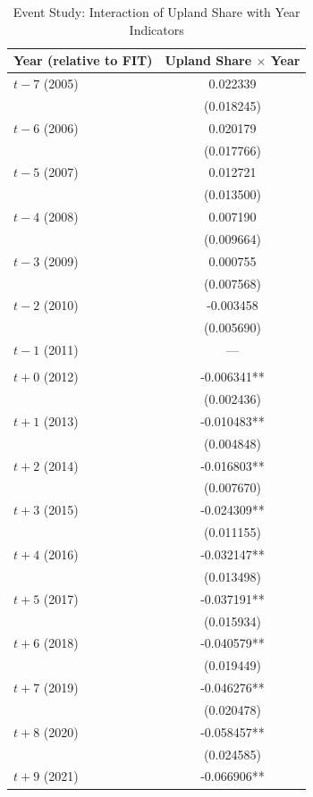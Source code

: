 \begin{table}[H]
\centering
\caption{Event Study: Interaction of Upland Share with Year Indicators}
\begin{threeparttable}
\begin{tabular}{lc}
\toprule
Year (relative to FIT) & Upland Share $\times$ Year \\
\midrule
$t-7$ (2005) & 0.022339 \\
 & (0.018245) \\
\addlinespace
$t-6$ (2006) & 0.020179 \\
 & (0.017766) \\
\addlinespace
$t-5$ (2007) & 0.012721 \\
 & (0.013500) \\
\addlinespace
$t-4$ (2008) & 0.007190 \\
 & (0.009664) \\
\addlinespace
$t-3$ (2009) & 0.000755 \\
 & (0.007568) \\
\addlinespace
$t-2$ (2010) & -0.003458 \\
 & (0.005690) \\
\addlinespace
$t-1$ (2011) & --- \\
 &  \\
\addlinespace
$t+0$ (2012) & -0.006341** \\
 & (0.002436) \\
\addlinespace
$t+1$ (2013) & -0.010483** \\
 & (0.004848) \\
\addlinespace
$t+2$ (2014) & -0.016803** \\
 & (0.007670) \\
\addlinespace
$t+3$ (2015) & -0.024309** \\
 & (0.011155) \\
\addlinespace
$t+4$ (2016) & -0.032147** \\
 & (0.013498) \\
\addlinespace
$t+5$ (2017) & -0.037191** \\
 & (0.015934) \\
\addlinespace
$t+6$ (2018) & -0.040579** \\
 & (0.019449) \\
\addlinespace
$t+7$ (2019) & -0.046276** \\
 & (0.020478) \\
\addlinespace
$t+8$ (2020) & -0.058457** \\
 & (0.024585) \\
\addlinespace
$t+9$ (2021) & -0.066906** \\

\end{tabular}
\end{threeparttable}
\end{table}
